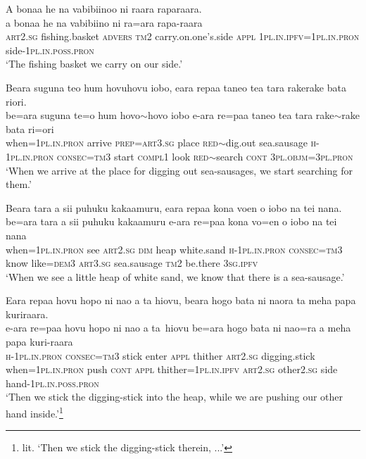 \ea\label{ex:text32-5}
A bonaa he na vabibiinoo ni raara raparaara.\\
\gll a	bonaa	he	na	vabibiino	ni	ra=ara	rapa-raara\\
     \textsc{art}2.\textsc{sg}	fishing.basket	\textsc{advers}	\textsc{tm}2	carry.on.one's.side	\textsc{appl}	1\textsc{pl}.\textsc{in}.\textsc{ipfv}=1\textsc{pl}.\textsc{in}.\textsc{pron}	side-1\textsc{pl}.\textsc{in}.\textsc{poss}.\textsc{pron}\\
\glt `The fishing basket we carry on our side.'
\z

\ea\label{ex:text32-6}
Beara suguna teo hum hovuhovu iobo, eara repaa taneo tea tara rakerake bata riori.\\
\gll be=ara	suguna	te=o	hum	hovo{$\sim$}hovo	iobo	e-ara	re=paa	taneo	tea	tara	rake{$\sim$}rake	bata	ri=ori\\
     when=1\textsc{pl}.\textsc{in}.\textsc{pron}	arrive	\textsc{prep}=\textsc{art}3.\textsc{sg}	place	\textsc{red}{$\sim$}dig.out	sea.sausage	\textsc{h}-1\textsc{pl}.\textsc{in}.\textsc{pron}	\textsc{consec}=\textsc{tm}3	start	\textsc{compl}1	look	\textsc{red}{$\sim$}search	\textsc{cont}	3\textsc{pl}.\textsc{objm}=3\textsc{pl}.\textsc{pron}\\
\glt `When we arrive at the place for digging out sea-sausages, we start searching for them.'
\z

\ea\label{ex:text32-7}
Beara tara a sii puhuku kakaamuru, eara repaa kona voen o iobo na tei nana.\\
\gll be=ara	tara	a	sii	puhuku	kakaamuru	e-ara	re=paa	kona	vo=en	o	iobo	na	tei	nana\\
     when=1\textsc{pl}.\textsc{in}.\textsc{pron}	see	\textsc{art}2.\textsc{sg}	\textsc{dim}	heap	white.sand	\textsc{h}-1\textsc{pl}.\textsc{in}.\textsc{pron}	\textsc{consec}=\textsc{tm}3	know	like=\textsc{dem}3	\textsc{art}3.\textsc{sg}	sea.sausage	\textsc{tm}2	be.there	3\textsc{sg}.\textsc{ipfv}\\
\glt `When we see a little heap of white sand, we know that there is a sea-sausage.'
\z

\ea\label{ex:text32-8}
Eara repaa hovu hopo ni nao a ta hiovu, beara hogo bata ni naora ta meha papa kuriraara.\\
\gll e-ara	re=paa	hovu	hopo	ni	nao	a	ta~hiovu	be=ara	hogo	bata	ni	nao=ra	a	meha	papa	kuri-raara\\
     \textsc{h}-1\textsc{pl}.\textsc{in}.\textsc{pron}	\textsc{consec}=\textsc{tm}3	stick	enter	\textsc{appl}	thither	\textsc{art}2.\textsc{sg}	digging.stick	when=1\textsc{pl}.\textsc{in}.\textsc{pron}	push	\textsc{cont}	\textsc{appl}	thither=1\textsc{pl}.\textsc{in}.\textsc{ipfv}	\textsc{art}2.\textsc{sg}	other2.\textsc{sg}	side	hand-1\textsc{pl}.\textsc{in}.\textsc{poss}.\textsc{pron}\\
\glt `Then we stick the digging-stick into the heap, while we are pushing our other hand inside.'\footnote{lit. `Then we stick the digging-stick therein, ...'}
\z

